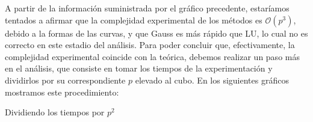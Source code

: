 A partir de la información suministrada por el gráfico precedente, estaríamos tentados a afirmar que la complejidad experimental de los métodos es $\mathcal{O}(p^3)$,
debido a la formas de las curvas, y que Gauss es más rápido que LU, lo cual no es correcto en este estadio del análisis. Para poder concluir que, efectivamente, la complejidad experimental coincide con
la teórica, debemos realizar un paso más en el análisis, que consiste en tomar los tiempos de la experimentación y dividirlos por su correspondiente $p$ elevado al cubo.
\newline
\newline
En los siguientes gráficos mostramos este procedimiento:
\begin{center}
    \caption{Dividiendo los tiempos por $p^2$}
\end{center}

